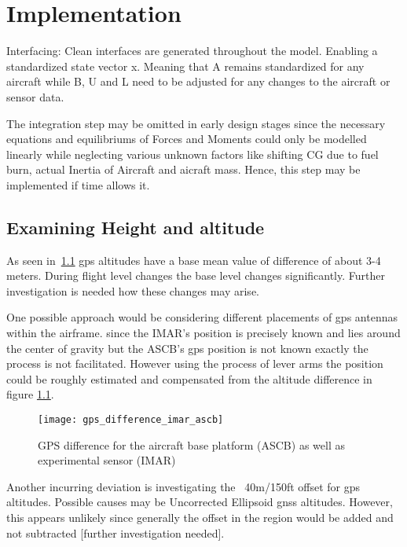 \chapter{Implementation}

Interfacing: Clean interfaces are generated throughout the model. Enabling a standardized state vector x. Meaning that A remains standardized for any aircraft while B, U and L need to be adjusted for any changes to the aircraft or sensor data.

The integration step may be omitted in early design stages since the necessary equations and equilibriums of Forces and Moments could only be modelled linearly while neglecting various unknown factors like shifting CG due to fuel burn, actual Inertia of Aircraft and aicraft mass. Hence, this step may be implemented if time allows it.

\section{Examining Height and altitude}

As seen in~\ref{fig:gps_diff} gps altitudes have a base mean value of difference of about 3-4 meters. During flight level changes the base level changes significantly. Further investigation is needed how these changes may arise.

One possible approach would be considering different placements of gps antennas within the airframe. since the IMAR's position is precisely known and lies around the center of gravity but the ASCB's gps position is not known exactly the process is not facilitated. However using the process of lever arms the position could be roughly estimated and compensated from the altitude difference in figure \ref{fig:gps_diff}.

\begin{figure}[h]
         \centering
         \texttt{[image: gps\_difference\_imar\_ascb]}
         \caption{GPS difference for the aircraft base platform (ASCB) as well as experimental sensor (IMAR)}
         \label{fig:gps_diff}
\end{figure}

Another incurring deviation is investigating the ~40m/150ft offset for gps altitudes. Possible causes may be Uncorrected Ellipsoid gnss altitudes. However, this appears unlikely since generally the offset in the region would be added and not subtracted [further investigation needed].

